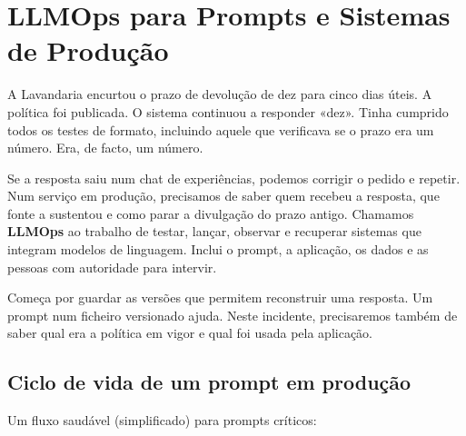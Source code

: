 \chapter{LLMOps para Prompts e Sistemas de Produção}
\label{ch:llmops}

\ficcao A Lavandaria encurtou o prazo de devolução de dez para cinco dias úteis. A política foi publicada. O sistema continuou a responder «dez». Tinha cumprido todos os testes de formato, incluindo aquele que verificava se o prazo era um número. Era, de facto, um número.

Se a resposta saiu num chat de experiências, podemos corrigir o pedido e repetir. Num serviço em produção, precisamos de saber quem recebeu a resposta, que fonte a sustentou e como parar a divulgação do prazo antigo. Chamamos \textbf{LLMOps} ao trabalho de testar, lançar, observar e recuperar sistemas que integram modelos de linguagem. Inclui o prompt, a aplicação, os dados e as pessoas com autoridade para intervir.

Começa por guardar as versões que permitem reconstruir uma resposta. Um prompt num ficheiro versionado ajuda. Neste incidente, precisaremos também de saber qual era a política em vigor e qual foi usada pela aplicação.

\section{Ciclo de vida de um prompt em produção}

Um fluxo saudável (simplificado) para prompts críticos:

